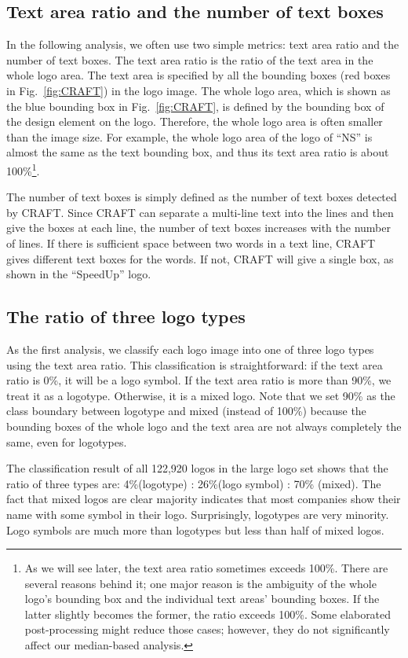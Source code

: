 \documentclass[runningheads]{llncs}
\begin{document}
\subsection{Text area ratio and the number of text boxes}
In the following analysis, we often use two simple metrics: text area ratio and the number of text boxes. The text area ratio is the ratio of the text area in the whole logo area. The text area is specified by all the bounding boxes (red boxes in Fig.~\ref{fig:CRAFT}) in the logo image. The whole logo area, which is shown as the blue bounding box in Fig.~\ref{fig:CRAFT}, 
is defined by the bounding box of the design element on the logo. Therefore, the whole logo area is often smaller than the image size. For example, the whole logo area of the logo of ``NS'' 
is almost the same as the text bounding box, and thus its text area ratio is about 100\%\footnote{As we will see later, the text area ratio sometimes exceeds 100\%. There are several reasons behind it; one major reason is the ambiguity of the whole logo's bounding box and the individual text areas' bounding boxes. If the latter slightly becomes the former, the ratio exceeds 100\%. Some elaborated post-processing might reduce those cases; however, they do not significantly affect our median-based analysis.}.\par
The number of text boxes is simply defined as the number of text boxes detected by CRAFT.  Since CRAFT can separate a multi-line text into the lines and then give the boxes at each line, 
the number of text boxes increases with the number of lines. If there is sufficient space between two words in a text line, CRAFT gives different text boxes for the words. If not, CRAFT will give a single box, as shown in the ``SpeedUp'' logo.

\subsection{The ratio of three logo types}
As the first analysis, we classify each logo image into one of three logo types using the text area ratio. This classification is straightforward: if the text area ratio is 0\%, it will be a logo symbol. If the text area ratio is more than 90\%, we treat it as a logotype. Otherwise, it is a mixed logo. Note that we set 90\% as the class boundary between logotype and mixed (instead of 100\%) because the bounding boxes of the whole logo and the text area are not always completely the same, even for logotypes.\par
%
The classification result  of all  122,920 logos in the large logo set shows that the ratio of three types are: 4\%(logotype) : 26\%(logo symbol) : 70\% (mixed). The fact that mixed logos are clear majority indicates that most companies show their name with some symbol in their logo. Surprisingly, logotypes are very minority. Logo symbols are much more than logotypes but less than half of mixed logos.
\end{document}
